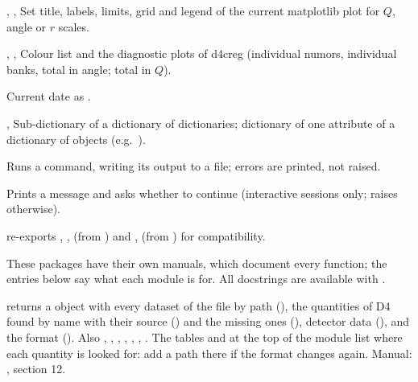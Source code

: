 \documentclass[11pt,a4paper]{article}
\begin{document}
, , 
Set title, labels, limits, grid and legend of the current matplotlib plot
for $Q$, angle or $r$ scales.

, , 
Colour list and the diagnostic plots of d4creg (individual numors,
individual banks, total in angle; total in $Q$).

Current date as .

, 
Sub-dictionary of a dictionary of dictionaries; dictionary of one
attribute of a dictionary of objects (e.g.\ ).

Runs a command, writing its output to a file; errors are printed, not raised.

Prints a message and asks whether to continue (interactive sessions only;
raises  otherwise).

\noindent {} re-exports ,
,  (from )
and ,  (from ) for
compatibility.


These packages have their own manuals, which document every function; the
entries below say what each module is for. All docstrings are available
with .

 returns a  object with every dataset
of the file by path (), the quantities of D4 found by name with
their source () and the missing ones (),
detector data (), and the format (). Also
, , ,
, ,
, . The tables  and
 at the top of the module list where each quantity is looked
for: add a path there if the format changes again. Manual:
, section 12.
\end{document}
